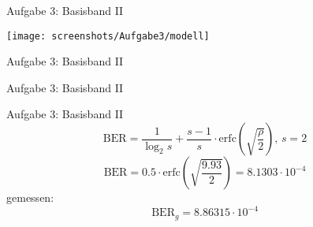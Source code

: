\begin{frame}{Aufgabe 3: Basisband II}
  \begin{center}
  \texttt{[image: screenshots/Aufgabe3/modell]}
  \end{center}
\end{frame}

\begin{frame}{Aufgabe 3: Basisband II}
\end{frame}

\begin{frame}{Aufgabe 3: Basisband II}
\end{frame}

\begin{frame}{Aufgabe 3: Basisband II}
  \[\mathrm{BER} = \frac{1}{\log_2{s}} + \frac{s-1}{s} \cdot
    \mathrm{erfc}{\left(\sqrt{\frac{\rho}{2}}\right)}, \, s = 2\]
  \[\mathrm{BER} = 0.5 \cdot \mathrm{erfc}{\left( \sqrt{\frac{9.93}{2}}
      \right)} = 8.1303 \cdot 10^{-4}\]
  gemessen:
  \[\mathrm{BER}_g = 8.86315 \cdot 10^{-4}\]
\end{frame}